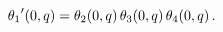 \[\mathop{\theta_{1}\/}\nolimits'\!\left(0,q\right)=\mathop{\theta_{2}\/}%
\nolimits\!\left(0,q\right)\mathop{\theta_{3}\/}\nolimits\!\left(0,q\right)%
\mathop{\theta_{4}\/}\nolimits\!\left(0,q\right).\]